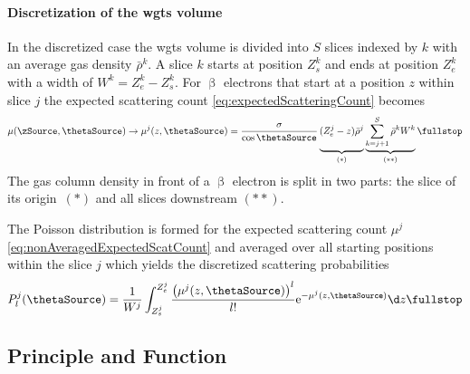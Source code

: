 \paragraph{Discretization of the \gls{wgts} volume}
In the discretized case the \gls{wgts} volume is divided into $S$ slices indexed by $k$ with an average gas density $\bar{\rho}^k$. A slice $k$ starts at position $Z_s^k$ and ends at position $Z_e^k$ with a width of $W^k=Z_e^k-Z_s^k$. For $\upbeta$ electrons that start at a position $z$ within slice $j$ the expected scattering count \eqref{eq:expectedScatteringCount} becomes
\begin{equation}
\label{eq:nonAveragedExpectedScatCount}
    \mu(\zSource, \thetaSource) \rightarrow 
    \mu^j(z, \thetaSource) =
    \frac{\sigma}{\cos\thetaSource}
    \underbrace{
        (Z_e^j-z) \bar{\rho}^j
        \vphantom{\sum_{k=j+1}^{S}}
    }_{(*)}
    \underbrace{\sum_{k=j+1}^{S} \bar{\rho}^k W^k}_{(**)}
    \fullstop
\end{equation}
The gas column density in front of a $\upbeta$ electron is split in two parts: the slice of its \mbox{origin $(*)$} and all slices downstream \mbox{$(**)$}. 

The Poisson distribution is formed for the expected scattering count $\mu^j$ \eqref{eq:nonAveragedExpectedScatCount} and averaged over all starting positions within the slice $j$ which yields the discretized scattering probabilities
\begin{equation}
    \label{eq:nonAveragedScatProbs}
    P^j_l(\thetaSource) = 
    \frac{1}{W^j}
    \int_{Z_s^j}^{Z_e^j}
        \frac{
            \left(\mu^j(z,\thetaSource)\right)^l
        }{l!}
        \mathrm{e}^{-\mu^j(z,\thetaSource)}
    \d z
    \fullstop
\end{equation}


\subsection{ Principle and  Function}
\label{sec:mace}
\begin{figure}[t]
	\label{fig:mace}
\end{figure}

